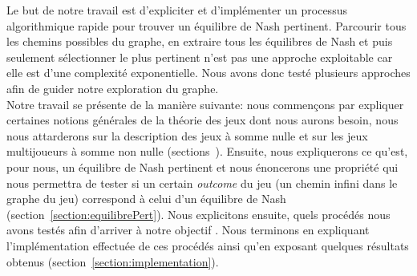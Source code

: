 Le but de notre travail est d'expliciter et d'implémenter un processus algorithmique rapide pour trouver un équilibre de Nash pertinent. Parcourir tous les chemins possibles du graphe, en extraire tous les équilibres de Nash et puis seulement sélectionner le plus pertinent n'est pas une approche exploitable car elle est d'une complexité exponentielle. Nous avons donc testé plusieurs approches afin de guider notre exploration du graphe.\\


Notre travail se présente de la manière suivante: nous commençons par expliquer certaines notions générales de la théorie des jeux dont nous aurons besoin, nous nous attarderons sur la description des jeux à somme nulle et sur les jeux multijoueurs à somme non nulle (sections~). Ensuite, nous expliquerons ce qu'est, pour nous, un équilibre de Nash pertinent et nous énoncerons une propriété qui nous permettra de tester si un certain \emph{outcome} du jeu (un chemin infini dans le graphe du jeu) correspond à celui d'un équilibre de Nash (section~\ref{section:equilibrePert}). Nous explicitons ensuite, quels procédés nous avons testés afin d'arriver à notre objectif . Nous terminons en expliquant l'implémentation effectuée de ces procédés ainsi qu'en exposant quelques résultats obtenus  (section~\ref{section:implementation}).
